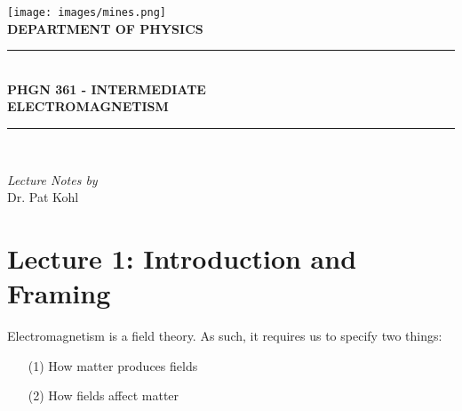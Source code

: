 \documentclass{article}
\numberwithin{equation}{section}
\begin{document}
\begin{titlepage}

\centering

\texttt{[image: images/mines.png]}\\[1cm]

\textsc{\large \textbf{DEPARTMENT OF PHYSICS}}\\[0.5cm]

{\rule{\linewidth}{0.5mm}}\\[0.1cm]
{\huge \textbf{PHGN 361 - INTERMEDIATE \\[0.1cm] ELECTROMAGNETISM}}\\[0.1cm]
{\rule{\linewidth}{0.5mm}}\\[1.0cm]

\vspace{1cm}

{\large \emph{Lecture Notes by}} \\[0.1cm]
{\huge Dr. Pat Kohl}

\vspace{4cm}

\begin{figure}[H]
\end{figure}

\vfill

\end{titlepage}

\newpage

\section*{Lecture 1: Introduction and Framing}
\setcounter{page}{1}

Electromagnetism is a field theory. As such, it requires us to specify two things:

\begin{enumerate}

\item[(1)] How matter produces fields

\item[(2)] How fields affect matter

\end{enumerate}
\end{document}
